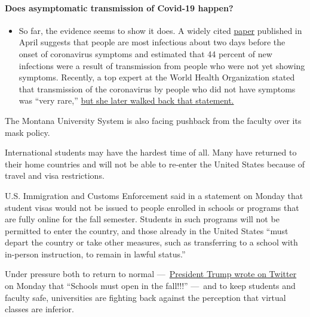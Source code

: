 \begin{itemize}
{  \paragraph{Does asymptomatic transmission of Covid-19
  happen?}\label{does-asymptomatic-transmission-of-covid-19-happen}}

  \begin{itemize}
  \tightlist
  \item
    So far, the evidence seems to show it does. A widely cited
    \href{https://www.nature.com/articles/s41591-020-0869-5}{paper}
    published in April suggests that people are most infectious about
    two days before the onset of coronavirus symptoms and estimated that
    44 percent of new infections were a result of transmission from
    people who were not yet showing symptoms. Recently, a top expert at
    the World Health Organization stated that transmission of the
    coronavirus by people who did not have symptoms was ``very rare,''
    \href{https://www.nytimes.com/2020/06/09/world/coronavirus-updates.html?action=click\&pgtype=Article\&state=default\&region=MAIN_CONTENT_3\&context=storylines_faq\#link-1f302e21}{but
    she later walked back that statement.}
  \end{itemize}
\end{itemize}

The Montana University System is also facing pushback from the faculty
over its mask policy.

International students may have the hardest time of all. Many have
returned to their home countries and will not be able to re-enter the
United States because of travel and visa restrictions.

U.S. Immigration and Customs Enforcement said in a statement on Monday
that student visas would not be issued to people enrolled in schools or
programs that are fully online for the fall semester. Students in such
programs will not be permitted to enter the country, and those already
in the United States ``must depart the country or take other measures,
such as transferring to a school with in-person instruction, to remain
in lawful status.''

Under pressure both to return to normal
---~\href{https://twitter.com/realDonaldTrump/status/1280209946085339136?s=20}{President
Trump wrote on Twitter} on Monday that ``Schools must open in the
fall!!!'' ---~and to keep students and faculty safe, universities are
fighting back against the perception that virtual classes are inferior.


